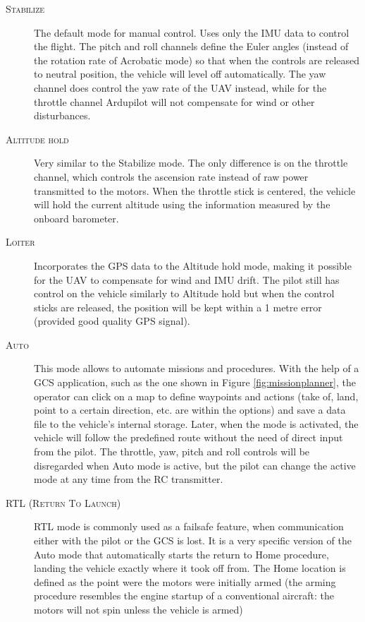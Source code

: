 \begin{description}

	\item[\scshape Stabilize] 
		The default mode for manual control.
		Uses only the IMU data to control the flight.
		The pitch and roll channels define the Euler angles (instead of the rotation rate of Acrobatic mode) so that when the controls are released to neutral position, the vehicle will level off automatically.
		The yaw channel does control the yaw rate of the UAV instead, while for the throttle channel
		Ardupilot will not compensate for wind or other disturbances.

	\item[\scshape Altitude hold]
		Very similar to the Stabilize mode.
		The only difference is on the throttle channel, which controls the ascension rate instead of raw power transmitted to the motors.
		When the throttle stick is centered, the vehicle will hold the current altitude using the information measured by the onboard barometer.

	\item[\scshape Loiter]
		Incorporates the GPS data to the Altitude hold mode, making it possible for the UAV to compensate for wind and IMU drift.
		The pilot still has control on the vehicle similarly to Altitude hold but when the control sticks are released, the position will be kept within a 1 metre error (provided good quality GPS signal).

	\item[\scshape Auto]
		This mode allows to automate missions and procedures.
		With the help of a GCS application, such as the one shown in Figure \ref{fig:missionplanner}, the operator can click on a map to define waypoints and actions (take of, land, point to a certain direction, etc. are within the options) and save a data file to the vehicle's internal storage.
		Later, when the mode is activated, the vehicle will follow the predefined route without the need of direct input from the pilot.
		The throttle, yaw, pitch and roll controls will be disregarded when Auto mode is active, but the pilot can change the active mode at any time from the RC transmitter.

	\item[\scshape RTL (Return To Launch)]
		RTL mode is commonly used as a failsafe feature, when communication either with the pilot or the GCS is lost.
		It is a very specific version of the Auto mode that automatically starts the return to Home procedure, landing the vehicle exactly where it took off from.
		The Home location is defined as the point were the motors were initially armed (the arming procedure resembles the engine startup of a conventional aircraft: the motors will not spin unless the vehicle is armed)


\end{description}

